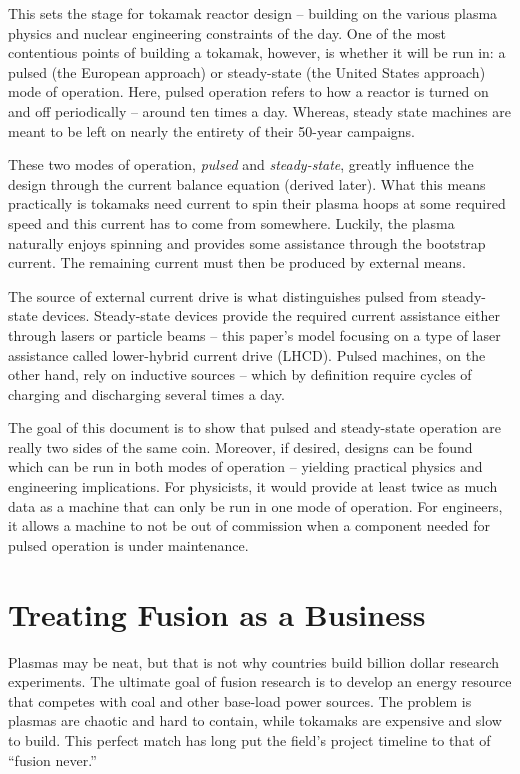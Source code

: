 \documentclass[11pt]{book}
\begin{document}
This sets the stage for tokamak reactor design -- building on the various plasma physics and nuclear engineering constraints of the day. One of the most contentious points of building a tokamak, however, is whether it will be run in: a pulsed (the European approach) or steady-state (the United States approach) mode of operation. Here, pulsed operation refers to how a reactor is turned on and off periodically -- around ten times a day. Whereas, steady state machines are meant to be left on nearly the entirety of their 50-year campaigns.

These two modes of operation, \emph{pulsed} and \emph{steady-state}, greatly influence the design through the current balance equation (derived later). What this means practically is tokamaks need current to spin their plasma hoops at some required speed and this current has to come from somewhere. Luckily, the plasma naturally enjoys spinning and provides some assistance through the bootstrap current. The remaining current must then be produced by external means.

The source of external current drive is what distinguishes pulsed from steady-state devices. Steady-state devices provide the required current assistance either through lasers or particle beams -- this paper's model focusing on a type of laser assistance called lower-hybrid current drive (LHCD). Pulsed machines, on the other hand, rely on inductive sources -- which by definition require cycles of charging and discharging several times a day.

The goal of this document is to show that pulsed and steady-state operation are really two sides of the same coin. Moreover, if desired, designs can be found which can be run in both modes of operation -- yielding practical physics and engineering implications. For physicists, it would provide at least twice as much data as a machine that can only be run in one mode of operation. For engineers, it allows a machine to not be out of commission when a component needed for pulsed operation is under maintenance.

\section{Treating Fusion as a Business}

Plasmas may be neat, but that is not why countries build billion dollar research experiments. The ultimate goal of fusion research is to develop an energy resource that competes with coal and other base-load power sources. The problem is plasmas are chaotic and hard to contain, while tokamaks are expensive and slow to build. This perfect match has long put the field's project timeline to that of ``fusion never.''
\end{document}
